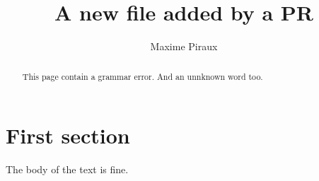 \documentclass[]{article}
\title{A new file added by a PR}
\author{Maxime Piraux}
\begin{document}
\maketitle

\begin{abstract}
This page contain a grammar error.
And an unnknown word too.
\end{abstract}

\section{First section}
The body of the text is fine.
\end{document}
